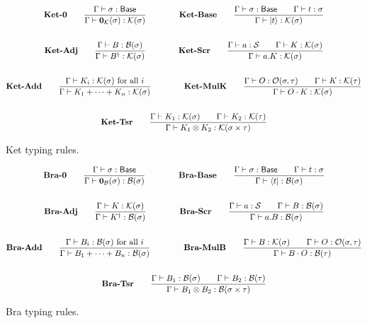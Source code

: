 \documentclass{article}
\begin{document}
\begin{figure}[h]
    \begin{gather*}
        \textbf{Ket-0} \qquad
        \frac{\Gamma \vdash \sigma : \mathsf{Base}}{\Gamma \vdash \mathbf{0}_\mathcal{K}(\sigma) : \mathcal{K}(\sigma)} 
        \qquad \qquad
        \textbf{Ket-Base} \qquad
        \frac{\Gamma \vdash \sigma : \mathsf{Base} \qquad \Gamma\vdash t : \sigma}{\Gamma \vdash \ket{t} : \mathcal{K}(\sigma)} \\
        \\
        \textbf{Ket-Adj} \qquad
        \frac{\Gamma \vdash B : \mathcal{B}(\sigma)}{\Gamma \vdash B^\dagger : \mathcal{K}(\sigma)} 
        \qquad \qquad
        \textbf{Ket-Scr} \qquad
        \frac{\Gamma \vdash a : \mathcal{S} \qquad \Gamma \vdash K : \mathcal{K}(\sigma)}{\Gamma \vdash a.K : \mathcal{K}(\sigma)} \\
        \\
        \textbf{Ket-Add} \qquad
        \frac{\Gamma \vdash K_i : \mathcal{K}(\sigma) \text{ for all $i$}}{\Gamma \vdash K_1 + \cdots + K_n : \mathcal{K}(\sigma)}
        \qquad \qquad
        \textbf{Ket-MulK} \qquad
        \frac{\Gamma \vdash O : \mathcal{O}(\sigma, \tau) \qquad \Gamma \vdash K : \mathcal{K}(\tau)}{\Gamma \vdash O \cdot K : \mathcal{K}(\sigma)} \\
        \\
        \textbf{Ket-Tsr} \qquad
        \frac{\Gamma \vdash K_1 : \mathcal{K}(\sigma) \qquad \Gamma \vdash K_2 : \mathcal{K}(\tau)} {\Gamma \vdash K_1 \otimes K_2 : \mathcal{K}(\sigma \times \tau)}
    \end{gather*}
    \caption{Ket typing rules.}
\end{figure}

\begin{figure}[h]
    \begin{gather*}
        \textbf{Bra-0} \qquad
        \frac{\Gamma \vdash \sigma : \mathsf{Base}}{\Gamma \vdash \mathbf{0}_\mathcal{B}(\sigma) : \mathcal{B}(\sigma)} 
        \qquad \qquad
        \textbf{Bra-Base} \qquad
        \frac{\Gamma \vdash \sigma : \mathsf{Base} \qquad \Gamma\vdash t : \sigma}{\Gamma \vdash \bra{t} : \mathcal{B}(\sigma)} \\
        \\
        \textbf{Bra-Adj} \qquad
        \frac{\Gamma \vdash K : \mathcal{K}(\sigma)}{\Gamma \vdash K^\dagger : \mathcal{B}(\sigma)} 
        \qquad \qquad
        \textbf{Bra-Scr} \qquad
        \frac{\Gamma \vdash a : \mathcal{S} \qquad \Gamma \vdash B : \mathcal{B}(\sigma)}{\Gamma \vdash a.B : \mathcal{B}(\sigma)} \\
        \\
        \textbf{Bra-Add} \qquad
        \frac{\Gamma \vdash B_i : \mathcal{B}(\sigma) \text{ for all $i$}}{\Gamma \vdash B_1 + \cdots + B_n : \mathcal{B}(\sigma)}
        \qquad \qquad
        \textbf{Bra-MulB} \qquad
        \frac{\Gamma \vdash B : \mathcal{K}(\sigma) \qquad \Gamma \vdash O : \mathcal{O}(\sigma, \tau)}{\Gamma \vdash B \cdot O : \mathcal{B}(\tau)} \\
        \\
        \textbf{Bra-Tsr} \qquad
        \frac{\Gamma \vdash B_1 : \mathcal{B}(\sigma) \qquad \Gamma \vdash B_2 : \mathcal{B}(\tau)} {\Gamma \vdash B_1 \otimes B_2 : \mathcal{B}(\sigma \times \tau)}
    \end{gather*}
    \caption{Bra typing rules.}
\end{figure}
\end{document}
